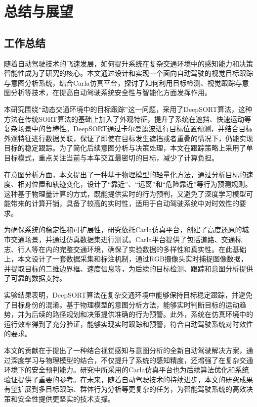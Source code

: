 \chapter{总结与展望}

\section{工作总结}

随着自动驾驶技术的飞速发展，如何提升系统在复杂交通环境中的感知能力和决策智能性成为了研究的核心。本文通过设计和实现一个面向自动驾驶的视觉目标跟踪与意图分析系统，结合Carla仿真平台，探讨了如何利用目标检测、视觉跟踪与意图分析等技术，在提高自动驾驶系统安全性与智能化方面发挥作用。

本研究围绕“动态交通环境中的目标跟踪”这一问题，采用了DeepSORT算法，这种方法在传统SORT算法的基础上加入了外观特征，提升了系统在遮挡、快速运动等复杂场景中的鲁棒性。DeepSORT通过卡尔曼滤波进行目标位置预测，并结合目标外观特征进行数据关联，保证了即使在目标发生遮挡或者重叠的情况下，仍能实现目标的稳定跟踪。为了简化后续意图分析与决策处理，本文在跟踪策略上采用了单目标模式，重点关注当前与本车交互最密切的目标，减少了计算负担。

在意图分析方面，本文提出了一种基于物理模型的轻量化方法，通过分析目标的速度、相对位置和轨迹变化，设计了“靠近”、“远离”和“危险靠近”等行为预测规则。这种基于物理量计算的方式，既能提供实时的行为预判，又避免了深度学习模型可能带来的计算开销，具备了较高的实时性，适用于自动驾驶系统中对时效性的要求。

为确保系统的稳定性和可扩展性，研究依托Carla仿真平台，创建了高度还原的城市交通场景，并通过仿真数据集进行测试。Carla平台提供了包括道路、交通标志、行人等在内的完整交通环境，确保了实验数据的多样性和真实性。在此基础上，本文设计了一套数据采集和标注机制，通过RGB摄像头实时捕捉图像数据，并提取目标的二维边界框、速度信息等，为后续的目标检测、跟踪和意图分析提供了可靠的数据支持。

实验结果表明，DeepSORT算法在复杂交通环境中能够保持目标稳定跟踪，并避免了目标身份的混淆。基于物理模型的意图分析方法，能够实时判断目标的运动趋势，并为后续的路径规划和决策提供准确的行为预警。此外，系统在仿真环境中的运行效率得到了充分验证，能够实现实时跟踪和预警，符合自动驾驶系统对时效性的要求。

本文的贡献在于提出了一种结合视觉感知与意图分析的全新自动驾驶解决方案，通过深度学习与物理模型的结合，不仅提升了系统的感知精度，还增强了在复杂交通环境下的安全预判能力。研究中所采用的Carla仿真平台也为后续算法优化和系统验证提供了重要的参考。在未来，随着自动驾驶技术的持续进步，本文的研究成果有望扩展到多目标跟踪、群体行为分析等更复杂的任务，为智能驾驶系统的高效决策和安全性提供更坚实的技术支撑。


